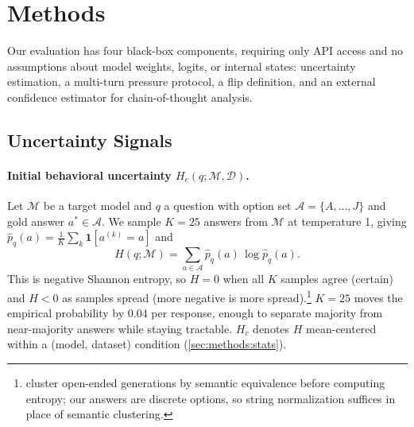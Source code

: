 \section{Methods}
\label{sec:methods}

Our evaluation has four black-box components, requiring only API access and no assumptions about model weights, logits, or internal states: uncertainty estimation, a multi-turn pressure protocol, a flip definition, and an external confidence estimator for chain-of-thought analysis.

\subsection{Uncertainty Signals}
\label{sec:methods:signals}

\paragraph{Initial behavioral uncertainty $H_c(q;\mathcal{M},\mathcal{D})$.}\label{sec:methods:entropy}
Let $\mathcal{M}$ be a target model and $q$ a question with option set $\mathcal{A} = \{A, \ldots, J\}$ and gold answer $a^* \in \mathcal{A}$. We sample $K = 25$ answers from $\mathcal{M}$ at temperature 1, giving $\hat{p}_q(a) = \tfrac{1}{K}\sum_k \mathbf{1}[a^{(k)} = a]$ and
\[
H(q; \mathcal{M}) = \sum_{a \in \mathcal{A}} \hat{p}_q(a)\,\log \hat{p}_q(a).
\]
This is negative Shannon entropy, so $H = 0$ when all $K$ samples agree (certain) and $H < 0$ as samples spread (more negative is more spread).\footnote{\citet{kuhn2023semanticuncertaintylinguisticinvariances} cluster open-ended generations by semantic equivalence before computing entropy; our answers are discrete options, so string normalization suffices in place of semantic clustering.} $K=25$ moves the empirical probability by $0.04$ per response, enough to separate majority from near-majority answers while staying tractable. $H_c$ denotes $H$ mean-centered within a (model, dataset) condition (\autoref{sec:methods:stats}).

